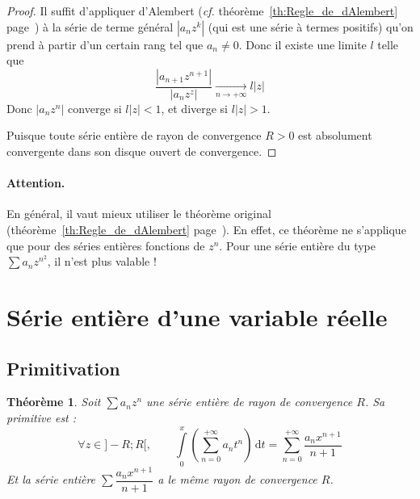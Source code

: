 \documentclass[11pt,a4paper]{report}
\newtheorem{theorem}{Théorème}[chapter]
\theoremstyle{definition}
\begin{document}
\begin{proof}
Il suffit d'appliquer d'Alembert (\textit{cf.} théorème~\ref{th:Regle_de_dAlembert} page~\pageref{th:Regle_de_dAlembert}) à la série de terme général $|a_n z^k|$ (qui est une série à termes positifs) qu'on prend à partir d'un certain rang tel que $a_n \neq 0$. Donc il existe une limite $l$ telle que \[\dfrac{|a_{n+1}z^{n+1}|}{|a_nz^z|}\xrightarrow[n\to +\infty]{} l|z|\]
Donc $|a_nz^n|$ converge si $l|z| < 1$, et diverge si $l|z| > 1$.
\par
Puisque toute série entière de rayon de convergence $R>0$ est absolument convergente dans son disque ouvert de convergence.
\end{proof}
\paragraph{Attention.} En général, il vaut mieux utiliser le théorème original (théorème~\ref{th:Regle_de_dAlembert} page~\pageref{th:Regle_de_dAlembert}). En effet, ce théorème ne s'applique que pour des séries entières fonctions de $z^n$. Pour une série entière du type $\sum a_n z^{n^2}$, il n'est plus valable !
\section{Série entière d'une variable réelle} %
\label{sec:serie_entiere_d_une_variable_reelle}
\subsection{Primitivation} %
\label{sub:primitivation_DSE}
\begin{theorem}
     Soit $\sum a_n z^n$ une série entière de rayon de convergence $R$. Sa primitive est :
        \begin{equation}
        \forall z\in ]-R;R[,\qquad \int \limits_0^x \left( \sum_{n=0}^{+\infty} a_n t^n \right)\,\mathrm{d} t = \sum_{n=0}^{+\infty} \dfrac{a_n x^{n+1}}{n+1} 
        \end{equation}
        Et la série entière $\sum \dfrac{a_n x^{n+1}}{n+1} $ a le même rayon de convergence $R$.
        \end{theorem}

\end{document}
